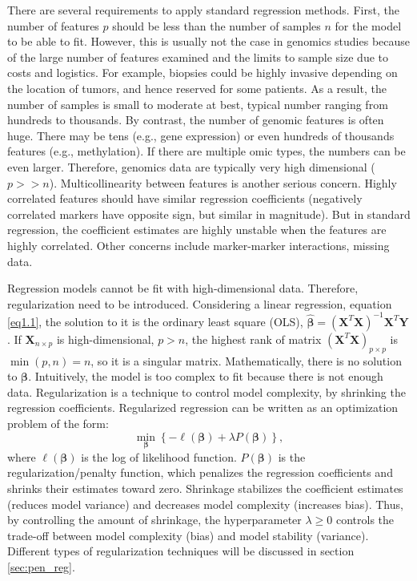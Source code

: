 There are several requirements to apply standard regression methods. First, the number of features $p$ should be less than the number of samples $n$ for the model to be able to fit. However, this is usually not the case in genomics studies because of the large number of features examined and the limits to sample size due to costs and logistics. For example, biopsies could be highly invasive depending on the location of tumors, and hence reserved for some patients. As a result, the number of samples is small to moderate at best, typical number ranging from hundreds to thousands. By contrast, the number of genomic features is often huge. There may be tens (e.g., gene expression) or even hundreds of thousands features (e.g., methylation). If there are multiple omic types, the numbers can be even larger. Therefore, genomics data are typically very high dimensional ($p>>n$). Multicollinearity between features is another serious concern. Highly correlated features should have similar regression coefficients (negatively correlated markers have opposite sign, but similar in magnitude). But in standard regression, the coefficient estimates are highly unstable when the features are highly correlated. Other concerns include marker-marker interactions, missing data. 

Regression models cannot be fit with high-dimensional data. Therefore, regularization need to be introduced. Considering a linear regression, equation \eqref{eq1.1}, the solution to it is the ordinary least square (OLS), $\hat{\bm{\beta}}=(\bm{X}^T\bm{X})^{-1}\bm{X}^T\bm{Y}$. If $\bm{X}_{n\times p}$ is high-dimensional, $p>n$, the highest rank of matrix $(\bm{X}^T\bm{X})_{p\times p}$ is $\min(p,n)=n$, so it is a singular matrix. Mathematically, there is no solution to $\bm{\beta}$. Intuitively, the model is too complex to fit because there is not enough data. Regularization is a technique to control model complexity, by shrinking the regression coefficients. Regularized regression can be written as an optimization problem of the form:
\begin{equation}
    \min_{\bm{\beta}} \left\{-\ell(\bm{\beta}) + \lambda P(\bm{\beta})\right\}, \label{eq1.3}
\end{equation}
where $\ell(\bm{\beta})$ is the log of likelihood function. $P(\bm{\beta})$ is the regularization/penalty function, which penalizes the regression coefficients and shrinks their estimates toward zero. Shrinkage stabilizes the coefficient estimates (reduces model variance) and decreases model complexity (increases bias). Thus, by controlling the amount of shrinkage, the hyperparameter $\lambda \geq0$ controls the trade-off between model complexity (bias) and model stability (variance). Different types of regularization techniques will be discussed in section \ref{sec:pen_reg}.



